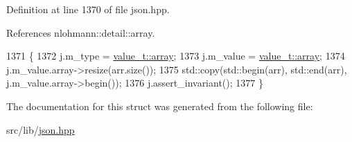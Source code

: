 Definition at line 1370 of file json.\+hpp.



References nlohmann\+::detail\+::array.


\begin{DoxyCode}
1371     \{
1372         j.m\_type = \hyperlink{namespacenlohmann_1_1detail_a1ed8fc6239da25abcaf681d30ace4985af1f713c9e000f5d3f280adbd124df4f5}{value\_t::array};
1373         j.m\_value = \hyperlink{namespacenlohmann_1_1detail_a1ed8fc6239da25abcaf681d30ace4985af1f713c9e000f5d3f280adbd124df4f5}{value\_t::array};
1374         j.m\_value.array->resize(arr.size());
1375         std::copy(std::begin(arr), std::end(arr), j.m\_value.array->begin());
1376         j.assert\_invariant();
1377     \}
\end{DoxyCode}


The documentation for this struct was generated from the following file\+:\begin{DoxyCompactItemize}
\item 
src/lib/\hyperlink{json_8hpp}{json.\+hpp}\end{DoxyCompactItemize}
